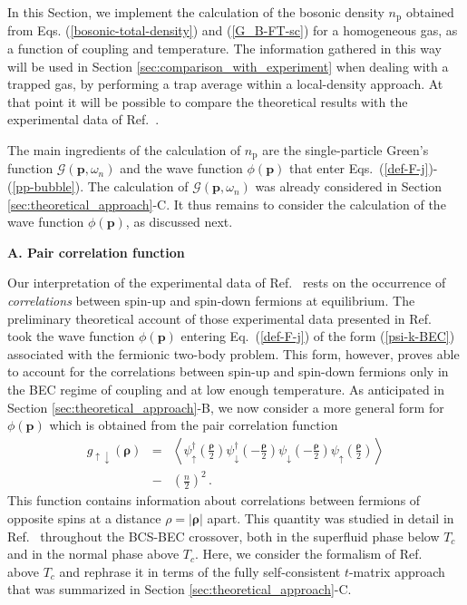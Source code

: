\documentclass[pra,twocolumn,aps,amssymb,showpacs,superscriptaddress]{revtex4-1}
\begin{document}
In this Section, we implement the calculation of the bosonic density $n_{\mathrm{p}}$ obtained from Eqs. (\ref{bosonic-total-density}) and (\ref{G_B-FT-sc}) for a homogeneous gas, as a function of coupling and  temperature.
The information gathered in this way will be used in Section \ref{sec:comparison_with_experiment} when dealing with a trapped gas, by performing a trap average within a local-density approach.
At that point it will be possible to compare the theoretical results with the experimental data of Ref.~\cite{Ulm-Cam-2019}.

The main ingredients of the calculation of $n_{\mathrm{p}}$ are the single-particle Green's function $\mathcal{G}(\mathbf{p},\omega_{n})$ and the wave function $\phi({\mathbf p})$ that enter 
Eqs.~(\ref{def-F-j})-(\ref{pp-bubble}).
The calculation of $\mathcal{G}(\mathbf{p},\omega_{n})$ was already considered in Section \ref{sec:theoretical_approach}-C. It thus remains to consider the calculation of the wave function $\phi({\mathbf p})$, as discussed next.

\vspace{0.05cm}
\begin{center}
{\bf A. Pair correlation function}
\end{center}

Our interpretation of the experimental data of Ref.~\cite{Ulm-Cam-2019} rests on the occurrence of \emph{correlations} between spin-up and spin-down fermions at equilibrium.
The preliminary theoretical account of those experimental data presented in Ref.~\cite{Ulm-Cam-2019} took the wave function $\phi({\mathbf p})$ entering Eq.~(\ref{def-F-j}) of the form
(\ref{psi-k-BEC}) associated with the fermionic two-body problem.
This form, however, proves able to account for the correlations between spin-up and spin-down fermions only in the BEC regime of coupling and at low enough temperature.
As anticipated in Section \ref{sec:theoretical_approach}-B, we now consider a more general form for $\phi({\mathbf p})$ which is obtained from the pair correlation function 
\begin{eqnarray}
g_{\uparrow \downarrow}(\boldsymbol{\rho}) & = &
\left\langle  \psi^{\dagger}_{\uparrow}\left(\frac{\boldsymbol{\rho}}{2}\right) \psi^{\dagger}_{\downarrow}\left(-\frac{\boldsymbol{\rho}}{2}\right) 
                   \psi_{\downarrow}\left(-\frac{\boldsymbol{\rho}}{2}\right) \psi_{\uparrow}\left(\frac{\boldsymbol{\rho}}{2}\right) \right\rangle 
\nonumber \\ 
& - & \left( \frac{n}{2} \right)^{2}  \, .                                                                       
\label{definition-pair-correlation-function}
\end{eqnarray}
This function contains information about correlations between fermions of opposite spins at a distance $\rho = |\boldsymbol{\rho}|$ apart.
This quantity was studied in detail in Ref.~\cite{Palestini-2014} throughout the BCS-BEC crossover, both in the superfluid phase below $T_{c}$ and in the normal phase above $T_{c}$.
Here, we consider the formalism of Ref.~\cite{Palestini-2014} above $T_{c}$ and rephrase it in terms of the fully self-consistent $t$-matrix approach that was summarized in 
Section \ref{sec:theoretical_approach}-C.
\end{document}
